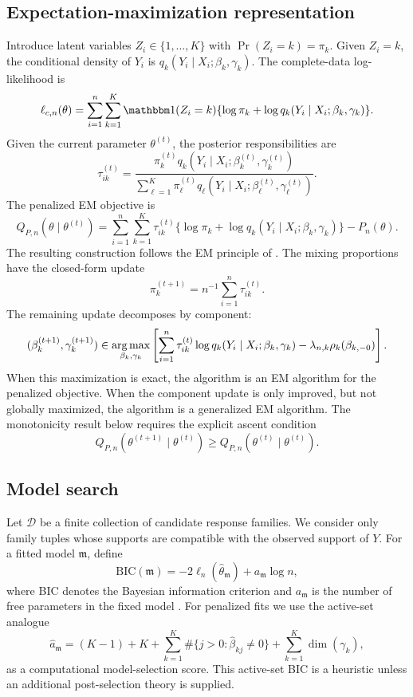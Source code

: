 \subsection{Expectation-maximization representation}

Introduce latent variables \(Z_i\in\{1,\ldots,K\}\) with
\(\Pr(Z_i=k)=\pi_k\).  Given \(Z_i=k\), the conditional density of \(Y_i\) is
\(q_k(Y_i\mid X_i;\beta_k,\gamma_k)\).  The complete-data log-likelihood is
\[
    \ell_{c,n}(\theta)
    =
    \sum_{i=1}^n\sum_{k=1}^K
    \mathbbm 1(Z_i=k)
    \{\log\pi_k+\log q_k(Y_i\mid X_i;\beta_k,\gamma_k)\}.
\]
Given the current parameter \(\theta^{(t)}\), the posterior responsibilities are
\[
    \tau_{ik}^{(t)}
    =
    \frac{
        \pi_k^{(t)}q_k(Y_i\mid X_i;\beta_k^{(t)},\gamma_k^{(t)})
    }{
        \sum_{\ell=1}^K
        \pi_\ell^{(t)}
        q_\ell(Y_i\mid X_i;\beta_\ell^{(t)},\gamma_\ell^{(t)})
    }.
\]
The penalized EM objective is
\[
    Q_{P,n}(\theta\mid\theta^{(t)})
    =
    \sum_{i=1}^n\sum_{k=1}^K
    \tau_{ik}^{(t)}
    \{\log\pi_k+\log q_k(Y_i\mid X_i;\beta_k,\gamma_k)\}
    -
    P_n(\theta).
\]
The resulting construction follows the EM principle of
\citet{dempster1977em}.  The mixing proportions have the closed-form update
\[
    \pi_k^{(t+1)}
    =
    n^{-1}\sum_{i=1}^n\tau_{ik}^{(t)}.
\]
The remaining update decomposes by component:
\[
    (\beta_k^{(t+1)},\gamma_k^{(t+1)})
    \in
    \operatorname*{arg\,max}_{\beta_k,\gamma_k}
    \left[
    \sum_{i=1}^n\tau_{ik}^{(t)}
    \log q_k(Y_i\mid X_i;\beta_k,\gamma_k)
    -
    \lambda_{n,k}\rho_k(\beta_{k,-0})
    \right].
\]
When this maximization is exact, the algorithm is an EM algorithm for the
penalized objective.  When the component update is only improved, but not
globally maximized, the algorithm is a generalized EM algorithm.  The
monotonicity result below requires the explicit ascent condition
\[
    Q_{P,n}(\theta^{(t+1)}\mid\theta^{(t)})
    \ge
    Q_{P,n}(\theta^{(t)}\mid\theta^{(t)}).
\]

\subsection{Model search}

Let \(\mathcal D\) be a finite collection of candidate response families.  We
consider only family tuples whose supports are compatible with the observed
support of \(Y\).  For a fitted model \(\mathfrak m\), define
\[
    \mathrm{BIC}(\mathfrak m)
    =
    -2\ell_n(\hat\theta_{\mathfrak m})
    +
    a_{\mathfrak m}\log n,
\]
where BIC denotes the Bayesian information criterion and
\(a_{\mathfrak m}\) is the number of free parameters in the fixed model
\citep{schwarz1978dimensions}.
For penalized fits we use the active-set analogue
\[
    \hat a_{\mathfrak m}
    =
    (K-1)
    +K
    +
    \sum_{k=1}^K
    \#\{j>0:\hat\beta_{kj}\neq 0\}
    +
    \sum_{k=1}^K\dim(\gamma_k),
\]
as a computational model-selection score.  This active-set BIC is a heuristic
unless an additional post-selection theory is supplied.

